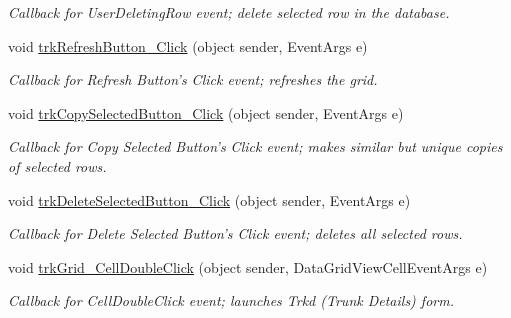 \begin{DoxyCompactItemize}
\begin{DoxyCompactList}\small\item\em Callback for UserDeletingRow event; delete selected row in the database. \item\end{DoxyCompactList}\item 
void \hyperlink{class_ias_pbx_config_1_1_trunks_ac79232f97537a0549ea51b8c2c2cd775}{trkRefreshButton\_\-Click} (object sender, EventArgs e)
\begin{DoxyCompactList}\small\item\em Callback for Refresh Button's Click event; refreshes the grid. \item\end{DoxyCompactList}\item 
void \hyperlink{class_ias_pbx_config_1_1_trunks_af34b4b2a4839c640dedb158ecd9b4756}{trkCopySelectedButton\_\-Click} (object sender, EventArgs e)
\begin{DoxyCompactList}\small\item\em Callback for Copy Selected Button's Click event; makes similar but unique copies of selected rows. \item\end{DoxyCompactList}\item 
void \hyperlink{class_ias_pbx_config_1_1_trunks_a0bcc050f33753a70b2918424ad6ceca9}{trkDeleteSelectedButton\_\-Click} (object sender, EventArgs e)
\begin{DoxyCompactList}\small\item\em Callback for Delete Selected Button's Click event; deletes all selected rows. \item\end{DoxyCompactList}\item 
void \hyperlink{class_ias_pbx_config_1_1_trunks_a040a120f3c938eef87f022132d28185b}{trkGrid\_\-CellDoubleClick} (object sender, DataGridViewCellEventArgs e)
\begin{DoxyCompactList}\small\item\em Callback for CellDoubleClick event; launches Trkd (Trunk Details) form. \item\end{DoxyCompactList}\end{DoxyCompactItemize}
